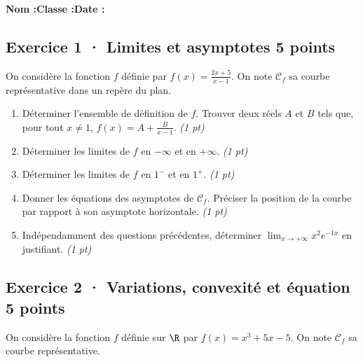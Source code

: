\smallskip\textbf{Nom :}\enspace\dotfill\quad\textbf{Classe :}\enspace\dotfill\quad\textbf{Date :}\enspace\dotfill

\subsection*{Exercice 1 · Limites et asymptotes \hfill 5 points}On considère la fonction $f$ définie par $f(x)=\frac{2x+5}{x-1}$. On note $\mathcal C_f$ sa courbe représentative dans un repère du plan.

\begin{enumerate}

\item Déterminer l'ensemble de définition de $f$. Trouver deux réels $A$ et $B$ tels que, pour tout $x\ne1$, $f(x)=A+\frac B{x-1}$. \hfill\textit{(1 pt)}

\item Déterminer les limites de $f$ en $-\infty$ et en $+\infty$. \hfill\textit{(1 pt)}

\item Déterminer les limites de $f$ en $1^-$ et en $1^+$. \hfill\textit{(1 pt)}

\item Donner les équations des asymptotes de $\mathcal C_f$. Préciser la position de la courbe par rapport à son asymptote horizontale. \hfill\textit{(1 pt)}

\item Indépendamment des questions précédentes, déterminer $\displaystyle\lim_{x\to+\infty}x^{2}e^{-1x}$ en justifiant. \hfill\textit{(1 pt)}

\end{enumerate}

\subsection*{Exercice 2 · Variations, convexité et équation \hfill 5 points}On considère la fonction $f$ définie sur $\R$ par $f(x)=x^3+5x-5$. On note $\mathcal C_f$ sa courbe représentative.

